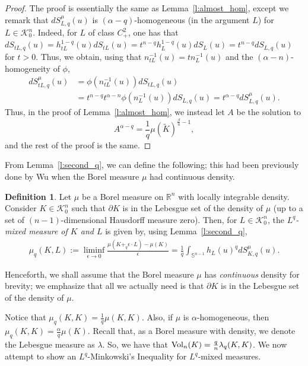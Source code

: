 \documentclass[11pt]{amsart}
\theoremstyle{definition}
\newtheorem{definition}[theorem]{Definition}
\theoremstyle{remark}
\numberwithin{equation}{section}
\newcommand{\R}{\mathbb{R}}
\newcommand{\s}{\mathbb{S}}
\newcommand{\conbod}{\mathcal{K}^n}
\newcommand{\vol}{\text{\rm Vol}}
\begin{document}
\begin{proof}
The proof is essentially the same as Lemma~\ref{l:almost_hom}, except we remark that $dS^{\mu}_{L,q}(u)$ is $(\alpha-q)$-homogeneous (in the argument $L$) for $L\in\conbod_0$. Indeed, for $L$ of class $C^2_+$, one has that $dS_{tL,q}(u)=h_{tL}^{1-q}(u)dS_{tL}(u)=t^{n-q}h_L^{1-q}(u)dS_L(u)=t^{n-q}dS_{L,q}(u)$ for $t>0$.  Thus, we obtain, using that $n^{-1}_{tL}(u)=tn^{-1}_{L}(u)$ and the $(\alpha-n)$-homogeneity of $\phi$,
\begin{align*}dS^{\mu}_{tL,q}(u)&=\phi\left(n^{-1}_{tL}(u)\right)dS_{tL,q}(u)
\\
&=t^{n-q}t^{\alpha-n}\phi\left(n^{-1}_{L}(u)\right)dS_{L,q}(u)=t^{\alpha-q}dS^{\mu}_{L,q}(u).\end{align*}
Thus, in the proof of Lemma~\ref{l:almost_hom}, we instead let $A$ be the solution to
$$A^{\alpha-q}=\frac{1}{q}\mu(\tilde{K})^{\frac{\beta}{n}-1},$$
and the rest of the proof is the same.
\end{proof}

From Lemma~\ref{l:second_q}, we can define the following; this had been previously done by Wu \cite{DW17} when the Borel measure $\mu$ had continuous density.
	\begin{definition}
	Let $\mu$ be a Borel measure on $\R^n$ with locally integrable density. Consider $K\in\conbod_0$ such that $\partial K$ is in the Lebesgue set of the density of $\mu$ (up to a set of $(n-1)$-dimensional Hausdorff measure zero). Then, for $L\in\conbod_0$, the \textit{$L^q$-mixed measure of $K$ and $L$} is given by, using Lemma~\ref{l:second_q},
	\begin{align*}
	    \mu_q(K,L):=\liminf_{\epsilon\to 0}\frac{\mu\left(K+_q\epsilon\cdot L\right)-\mu(K)}{\epsilon}
	    =\frac{1}{q}\int_{\s^{n-1}}h_L(u)^qdS^{\mu}_{K,q}(u).
	\end{align*}
	\end{definition}
\noindent Henceforth, we shall assume that the Borel measure $\mu$ has \textit{continuous} density for brevity; we emphasize that all we actually need is that $\partial K$ is in the Lebesgue set of the density of $\mu$.
	
Notice that $\mu_q(K,K)=\frac{1}{q}\mu(K,K)$. Also, if $\mu$ is $\alpha$-homogeneous, then $\mu_q(K,K)=\frac{\alpha}{q}\mu(K)$. Recall that, as a Borel measure with density, we denote the Lebesgue measure as $\lambda$. So, we have that $\vol_n(K)=\frac{q}{n}\lambda_q(K,K)$. We now attempt to show an $L^q$-Minkowski's Inequality for $L^q$-mixed measures. 
\end{document}
